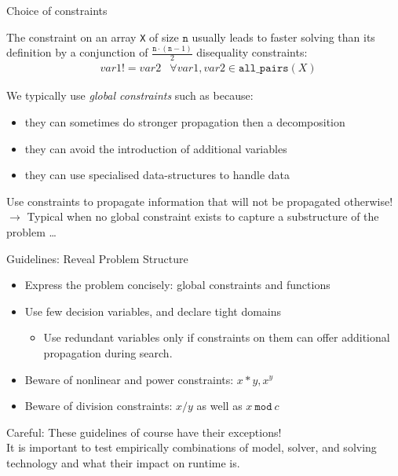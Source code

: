 \documentclass{cons-beamer}
\begin{document}
\begin{frame}{Choice of constraints}
  \begin{example}
    The constraint  on an array
    \texttt{X} of size $\mathtt{n}$ usually leads to faster
    solving than its definition by a conjunction of
    $\frac{\mathtt{n}\cdot(\mathtt{n}-1)}{2}$ disequality
    constraints:
    \begin{align*}
      &var1 != var2 & \forall var1, var2 \in \mathtt{all\_pairs}(X)
    \end{align*}
  \end{example}
  \vspace{1em}

  We typically use \textit{global constraints} such as  because:
  \begin{itemize}
    \item they can sometimes do stronger propagation then a decomposition
    \item they can avoid the introduction of additional variables
    \item they can use specialised data-structures to handle data
  \end{itemize}

  Use  constraints to propagate information that will not be propagated otherwise!
  \\ $\xrightarrow{}$ Typical when no global constraint exists to capture a substructure of the problem \dots
\end{frame}

\begin{frame}{Guidelines: Reveal Problem Structure}
  \begin{itemize}
    \item Express the problem concisely: global constraints and functions

    \item Use few decision variables, and declare tight domains
      \begin{itemize}
        \item Use redundant variables only if constraints on them can offer additional propagation during search.
      \end{itemize}

    \item Beware of nonlinear and power constraints: $x*y, x^y$

    \item Beware of division constraints: 
      $x / y$ as well as $x ~\mathtt{mod}~ c$

  \end{itemize}
  \vfill

  \alert{Careful: These guidelines of course have their exceptions!} \\
  It is important to test empirically combinations of
  model, solver, and solving technology and what their impact on runtime is.
\end{frame}
\end{document}
